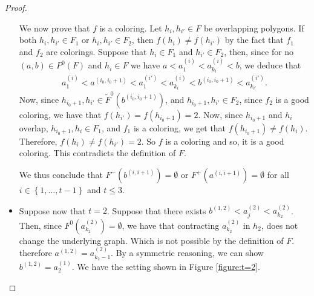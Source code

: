 \documentclass[12pt]{article}
\theoremstyle{definition}
\begin{document}
\begin{proof}
\begin{itemize}
             We now prove that $f$ is a coloring.
             Let $h_{i}, h_{i'} \in F$ be overlapping
             polygons. If both $h_{i}, h_{i'} \in F_1$ 
             or $h_{i}, h_{i'} \in F_2$, then 
             $f\left(h_{i}\right) \neq f\left(h_{i'}\right)$
             by the fact that $f_1$ and $f_2$ 
             are colorings.
             Suppose that $h_{i} \in F_1$ and
             $h_{i'} \in F_2$, then, since for no
             $\left(a, b\right) \in P^{0}\left(F\right)$ 
             and $h_{i} \in F$ we have
             $a < a_{1}^{\left(i\right)} <
             a_{k_{i}}^{\left(i\right)} < b$, we deduce that
             \begin{gather*}
                 a_1^{\left(i\right)} < 
                 a^{\left(i_0, i_0+1\right)} <
                 a_1^{\left(i'\right)} < 
                 a_{k_{i}}^{\left(i\right)} < 
                 b^{\left(i_0, i_0+1\right)} < 
                 a_{k_{i'}}^{\left(i'\right)}.
             \end{gather*}
             Now, since $h_{i_0+1}, h_{i'} \in 
             \widetilde{F}^{0}\left(b^{\left(i_0, i_0+1\right)}\right)$,
             and $h_{i_0+1}, h_{i'} \in F_2$,
             since $f_2$ is a good
             coloring, we have that $f\left(h_{i'}\right) =
             f\left(h_{i_0+1}\right) = 2$.
             Now, since $h_{i_0+1}$ and $h_{i}$ 
             overlap, 
             $h_{i_0+1}, h_{i} \in F_1$,
             and $f_1$ is a coloring, we get
             that $f\left(h_{i_0+1}\right) \neq
             f\left(h_{i}\right)$.
             Therefore, $f\left(h_{i}\right) \neq 
             f\left(h_{i'}\right) = 2$.
             So $f$ is a coloring and so,
             it is a good coloring.
             This contradicts the definition
             of $F$.

             We thus conclude that
             $F^{-}\left(b^{\left(i, i+1\right)}\right) = \emptyset$ 
             or $F^{+}\left(a^{\left(i, i+1\right)}\right) = \emptyset$
             for all $i \in \left\{1, \ldots, t-1\right\}$ and
             $t \leq 3$.

             \item Suppose now that $t = 2$.
             Suppose that there exists
             $b^{\left(1,2\right)} < 
             a_{j}^{\left(2\right)} <
             a_{k_2}^{\left(2\right)}$.
             Then, since $F^{0}\left(a_{k_2}^{\left(2\right)}\right) = 
             \emptyset$, we have that 
             contracting $a_{k_2}^{\left(2\right)}$
             in $h_2$, does not change the underlying 
             graph. Which is not possible by
             the definition of $F$.
             therefore $a^{\left(1,2\right)} =
             a_{k_2-1}^{\left(2\right)}$. By a
             symmetric reasoning, we can show
             $b^{\left(1, 2\right)} = a_2^{\left(1\right)}$.
             We have the setting shown in Figure \ref{figure:t=2}.


\end{itemize}
\end{proof}
\end{document}

